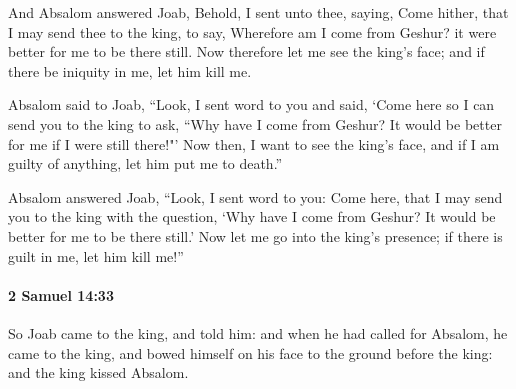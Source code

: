 			\begin{versebox}
					\item[BHS] 
					\item[ASV] And Absalom answered Joab, Behold, I sent unto thee, saying, Come hither, that I may send thee to the king, to say, Wherefore am I come from Geshur? it were better for me to be there still. Now therefore let me see the king's face; and if there be iniquity in me, let him kill me.
					\item[NIV] Absalom said to Joab, “Look, I sent word to you and said, ‘Come here so I can send you to the king to ask, “Why have I come from Geshur? It would be better for me if I were still there!"’ Now then, I want to see the king’s face, and if I am guilty of anything, let him put me to death.”
					\item[NRSV] Absalom answered Joab, “Look, I sent word to you: Come here, that I may send you to the king with the question, ‘Why have I come from Geshur? It would be better for me to be there still.’ Now let me go into the king’s presence; if there is guilt in me, let him kill me!”
			\end{versebox}

		\paragraph{2 Samuel 14:33} %
			\label{2SAMUEL-14-33}

			So Joab came to the king, and told him: and when he had called for Absalom, he came to the king, and bowed himself on his face to the ground before the king: and the king kissed Absalom.

